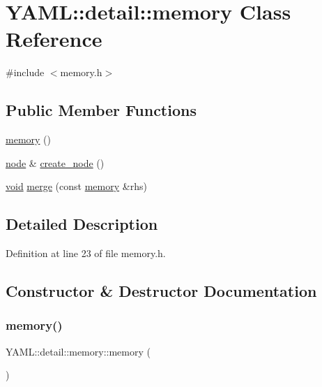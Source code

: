 \hypertarget{class_y_a_m_l_1_1detail_1_1memory}{}\section{Y\+A\+ML\+::detail\+::memory Class Reference}
\label{class_y_a_m_l_1_1detail_1_1memory}


{\ttfamily \#include $<$memory.\+h$>$}

\subsection*{Public Member Functions}
\begin{DoxyCompactItemize}
\item 
\mbox{\hyperlink{class_y_a_m_l_1_1detail_1_1memory_a1d7fa3208a5e7c978375a5cf61d66047}{memory}} ()
\item 
\mbox{\hyperlink{class_y_a_m_l_1_1detail_1_1node}{node}} \& \mbox{\hyperlink{class_y_a_m_l_1_1detail_1_1memory_a0b8bc8ca722445823cd844e4dec22747}{create\+\_\+node}} ()
\item 
\mbox{\hyperlink{glad_8h_a950fc91edb4504f62f1c577bf4727c29}{void}} \mbox{\hyperlink{class_y_a_m_l_1_1detail_1_1memory_a612781f2174ffe5d88637ae9235dd162}{merge}} (const \mbox{\hyperlink{class_y_a_m_l_1_1detail_1_1memory}{memory}} \&rhs)
\end{DoxyCompactItemize}


\subsection{Detailed Description}


Definition at line 23 of file memory.\+h.



\subsection{Constructor \& Destructor Documentation}
\mbox{\label{class_y_a_m_l_1_1detail_1_1memory_a1d7fa3208a5e7c978375a5cf61d66047}} 
\subsubsection{\texorpdfstring{memory()}{memory()}}
{\footnotesize\ttfamily Y\+A\+M\+L\+::detail\+::memory\+::memory (\begin{DoxyParamCaption}{ }\end{DoxyParamCaption})\hspace{0.3cm}{\ttfamily [inline]}}



